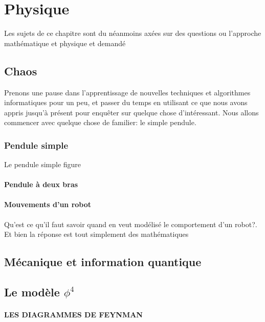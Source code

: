 \part{Physique}

Les sujets de ce chapitre sont du néanmoins axées sur des questions ou l'approche mathématique et 
physique et demandé 

\chapter{Chaos}
Prenons une pause dans l'apprentissage de nouvelles techniques et algorithmes informatiques
pour un peu, et passer du temps en utilisant ce que nous avons appris jusqu'à présent pour enquêter sur quelque chose d'intéressant. Nous allons commencer avec quelque chose de familier: le simple pendule.
\section{Pendule simple}
Le pendule simple figure
\subsection{Pendule à deux bras}
\subsection{Mouvements d’un robot}
Qu'est ce qu'il faut savoir quand en veut modélisé le comportement d'un robot?. Et bien la réponse est tout simplement des mathématiques

\chapter{M\'ecanique et information quantique}
\chapter{Le modèle $\phi^{4}$}
 \subsection{LES DIAGRAMMES DE FEYNMAN}
 
